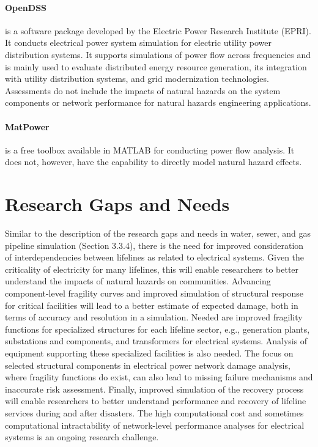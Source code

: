 \paragraph{OpenDSS} 
 is a software package developed by the Electric Power Research Institute (EPRI). It conducts electrical power system simulation for electric utility power distribution systems. It supports simulations of power flow across frequencies and is mainly used to evaluate distributed energy resource generation, its integration with utility distribution systems, and grid modernization technologies. Assessments do not include the impacts of natural hazards on the system components or network performance for natural hazards engineering applications.

\paragraph{MatPower}  \citep{zimmerman2011matpower} is a free toolbox available in MATLAB for conducting power flow analysis. It does not, however, have the capability to directly model natural hazard effects.

\section{Research Gaps and Needs}
\label{sec:perf_power_gaps}

Similar to the description of the research gaps and needs in water, sewer, and gas pipeline simulation (Section 3.3.4), there is the need for improved consideration of interdependencies between lifelines as related to electrical systems. Given the criticality of electricity for many lifelines, this will enable researchers to better understand the impacts of natural hazards on communities. Advancing component-level fragility curves and improved simulation of structural response for critical facilities will lead to a better estimate of expected damage, both in terms of accuracy and resolution in a simulation. Needed are improved fragility functions for specialized structures for each lifeline sector, e.g., generation plants, substations and components, and transformers for electrical systems. Analysis of equipment supporting these specialized facilities is also needed. The focus on selected structural components in electrical power network damage analysis, where fragility functions do exist, can also lead to missing failure mechanisms and inaccurate risk assessment. Finally, improved simulation of the recovery process will enable researchers to better understand performance and recovery of lifeline services during and after disasters. The high computational cost and sometimes computational intractability of network-level performance analyses for electrical systems is an ongoing research challenge.

